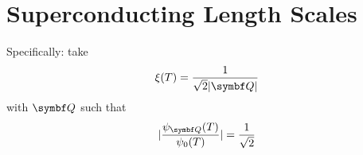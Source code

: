 \documentclass[../notes.tex]{subfiles}
\begin{document}
\raggedbottom
	
\chapter{Superconducting Length Scales}


Specifically: take
\begin{equation}
	\xi(T) = \frac{1}{\sqrt{2} \vert \vb{Q} \vert}
\end{equation}
with \(\vb{Q}\) such that
\begin{equation}
	\vert \frac{\psi_{\vb{Q}}(T)}{\psi_0 (T)} \vert = \frac{1}{\sqrt{2}}
\end{equation}



	
\end{document}
